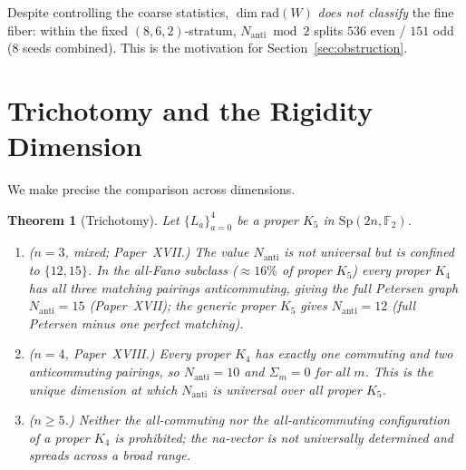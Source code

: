 \documentclass[11pt,a4paper]{article}
\newtheorem{theorem}{Theorem}[section]
\theoremstyle{remark}
\newcommand{\Sp}{\mathrm{Sp}}
\newcommand{\rad}{\mathrm{rad}}
\newcommand{\Nanti}{N_{\mathrm{anti}}}
\begin{document}
Despite controlling the coarse statistics, $\dim\rad(W)$ \emph{does not classify} the
fine fiber: within the fixed $(8,6,2)$-stratum, $\Nanti\bmod2$ splits
$536$ even / $151$ odd (8 seeds combined).
This is the motivation for Section~\ref{sec:obstruction}.

\section{Trichotomy and the Rigidity Dimension}\label{sec:structure}

We make precise the comparison across dimensions.

\begin{theorem}[Trichotomy]\label{thm:trichotomy}
Let $\{L_a\}_{a=0}^4$ be a proper $K_5$ in $\Sp(2n,\mathbb F_2)$.
\begin{enumerate}
\item \emph{($n=3$, mixed; Paper~XVII.)} The value $\Nanti$ is not universal but
  is confined to $\{12,15\}$. In the all-Fano subclass ($\approx16\%$ of proper
  $K_5$) every proper $K_4$ has all three matching pairings anticommuting, giving
  the full Petersen graph $\Nanti=15$ (Paper~XVII); the generic proper $K_5$ gives
  $\Nanti=12$ (full Petersen minus one perfect matching).
\item \emph{($n=4$, Paper~XVIII.)} Every proper $K_4$ has exactly one commuting and
  two anticommuting pairings, so $\Nanti=10$ and $\Sigma_m=0$ for all $m$. This is
  the \emph{unique} dimension at which $\Nanti$ is universal over all proper $K_5$.
\item \emph{($n\ge5$.)} Neither the all-commuting nor the all-anticommuting
  configuration of a proper $K_4$ is prohibited; the na-vector is not universally
  determined and spreads across a broad range.
\end{enumerate}
\end{theorem}
\end{document}
